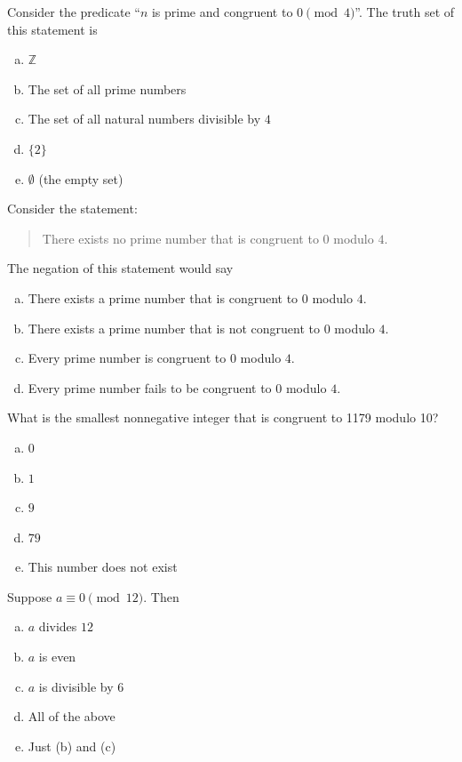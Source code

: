\documentclass[palatino]{beamer}
\begin{document}
\begin{frame}
	Consider the predicate ``$n$ is prime and congruent to $0 \pmod 4$''. The truth set of this statement is 
	\begin{enumerate}[(a)]
		\item $\mathbb{Z}$
		\item The set of all prime numbers
		\item The set of all natural numbers divisible by $4$
		\item $\{ 2 \}$
		\item $\emptyset$ (the empty set)
	\end{enumerate}

\end{frame}

\begin{frame}
	Consider the statement: 
	\begin{quote}
		There exists no prime number that is congruent to $0$ modulo $4$. 
	\end{quote}
The negation of this statement would say
\begin{enumerate}[(a)]
	\item There exists a prime number that is congruent to $0$ modulo $4$.
	\item There exists a prime number that is not congruent  to $0$ modulo $4$.
	\item Every prime number is congruent to $0$ modulo $4$.
	\item Every prime number fails to be congruent to $0$ modulo $4$. 
\end{enumerate}
\end{frame}


\begin{frame}
What is the smallest nonnegative integer that is congruent to 1179 modulo 10?
\begin{enumerate}[(a)]
	\item $0$
	\item $1$
	\item $9$
	\item $79$
	\item This number does not exist
\end{enumerate}
\end{frame}

\begin{frame}
	Suppose $a \equiv 0 \pmod {12}$. Then
	\begin{enumerate}[(a)]
		\item $a$ divides $12$
		\item $a$ is even
		\item $a$ is divisible by $6$
		\item All of the above
		\item Just (b) and (c)
	\end{enumerate}
\end{frame}
\end{document}

